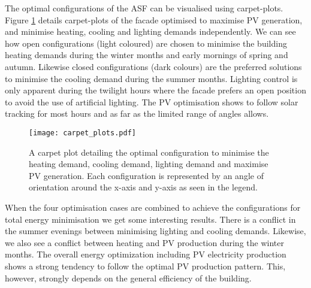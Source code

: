 


The optimal configurations of the ASF can be visualised using carpet-plots. Figure \ref{fig:carpetplot} details carpet-plots of the facade optimised to maximise PV generation, and minimise heating, cooling and lighting demands independently. We can see how open configurations (light coloured) are chosen to minimise the building heating demands during the winter months and early mornings of spring and autumn. Likewise closed configurations (dark colours) are the preferred solutions to minimise the cooling demand during the summer months. Lighting control is only apparent during the twilight hours where the facade prefers an open position to avoid the use of artificial lighting. The PV optimisation shows to follow solar tracking for most hours and as far as the limited range of angles allows. 

\begin{figure}
\begin{center}
\texttt{[image: carpet\_plots.pdf]}
\caption{A carpet plot detailing the optimal configuration to minimise the heating demand, cooling demand, lighting demand and maximise PV generation. Each configuration is represented by an angle of orientation around the x-axis and y-axis as seen in the legend.}
\label{fig:carpetplot}
\end{center}
\end{figure}

When the four optimisation cases are combined to achieve the configurations for total energy minimisation we get some interesting results. There is a conflict in the summer evenings between minimising lighting and cooling demands. Likewise, we also see a conflict between heating and PV production during the winter months. The overall energy optimization including PV electricity production shows a strong tendency to follow the optimal PV production pattern. This, however, strongly depends on the general efficiency of the building. 


